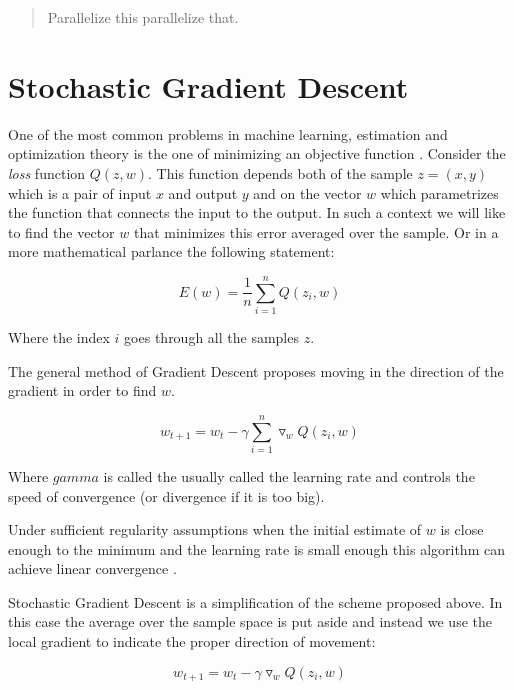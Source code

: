 \documentclass[11pt,a4paper]{article}
\begin{document}
\begin{abstract}
Parallelize this parallelize that.

\end{abstract}

\section{Stochastic Gradient Descent}


One of the most common problems in machine learning, estimation and optimization theory is the one of minimizing an objective function \citep{bottou2010large}. Consider the \textit{loss} function $Q(z, w)$. This function depends both of the sample $z=(x, y)$ which is a pair of input $x$ and output $y$ and on the vector $w$ which parametrizes the function that connects the input to the output. In such a context we will like to find the vector $w$ that minimizes this error averaged over the sample. Or in a more mathematical parlance the following statement:

\begin{equation}
E(w) = \frac{1}{n} \sum_{i=1}^n Q(z_i, w)
\end{equation}

Where the index $i$ goes through all the samples $z$. 

The general method of Gradient Descent proposes moving in the direction of the gradient in order to find $w$. 

\begin{equation}
w_{t + 1} = w_t - \gamma \sum_{i=1}^n \triangledown_w Q(z_i, w)
\end{equation}

Where $gamma$ is called the usually called the learning rate and controls the speed of convergence (or divergence if it is too big). 

Under sufficient regularity assumptions when the initial estimate of $w$ is close enough to the minimum and the learning rate is small enough this algorithm can achieve linear convergence \citep{dennis1996numerical}. 

Stochastic Gradient Descent is a simplification of the scheme proposed above. In this case the average over the sample space is put aside and instead we use the local gradient to indicate the proper direction of movement:

\begin{equation}
w_{t + 1} = w_t - \gamma  \triangledown_w Q(z_i, w)
\end{equation} 
\end{document}
